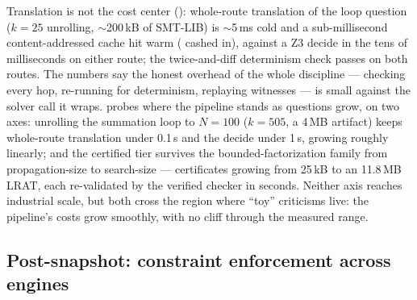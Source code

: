 Translation is not the cost center\ifarxiv{} ()\fi: whole-route translation of the loop
question ($k{=}25$ unrolling, $\sim$200\,kB of SMT-LIB) is
$\sim$5\,ms cold and a sub-millisecond content-addressed cache hit warm
( cashed in), against a Z3 decide in the tens of
milliseconds on either
route; the
twice-and-diff determinism check passes on both routes. The numbers say
the honest overhead of the whole discipline --- checking every hop,
re-running for determinism, replaying witnesses --- is small against
the solver call it wraps.  probes where the pipeline
stands as questions grow, on two axes: unrolling the summation loop to
$N{=}100$ ($k{=}505$, a 4\,MB artifact) keeps whole-route translation
under 0.1\,s and the decide under 1\,s, growing roughly linearly; and
the certified tier survives the bounded-factorization family from
propagation-size to search-size --- certificates growing from 25\,kB to
an 11.8\,MB LRAT, each re-validated by the verified checker in seconds.
Neither axis reaches industrial scale, but both cross the region where
``toy'' criticisms live: the pipeline's costs grow smoothly, with no
cliff through the measured range.

\ifarxiv
\subsection{Post-snapshot: constraint enforcement across engines}
\label{sec:eval-constraint}



